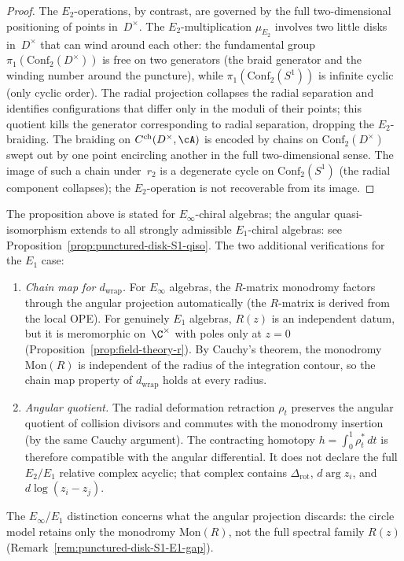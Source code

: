\begin{proof}
The $E_2$-operations, by contrast, are governed by the
full two-dimensional positioning of points in~$D^\times$.
The $E_2$-multiplication $\mu_{E_2}$ involves two
little disks in~$D^\times$ that can wind around each
other: the fundamental group
$\pi_1(\mathrm{Conf}_2(D^\times))$ is free on two
generators (the braid generator and the winding number
around the puncture), while
$\pi_1(\mathrm{Conf}_2(S^1))$ is infinite cyclic
(only cyclic order).
The radial projection collapses the radial separation
and identifies configurations that differ only in the
moduli of their points; this quotient kills the
generator corresponding to radial separation, dropping the $E_2$-braiding.
The braiding on
$C^{\mathrm{ch}}(D^\times,\cA)$ is encoded by chains
on $\mathrm{Conf}_2(D^\times)$ swept out by one point
encircling another in the full two-dimensional sense.
The image of such a chain under~$r_2$ is a
degenerate cycle on $\mathrm{Conf}_2(S^1)$ (the
radial component collapses); the $E_2$-operation
is not recoverable from its image.
\end{proof}

\begin{remark}%
\label{rem:chain-D-vs-S1-E1}%
The proposition above is stated for $E_\infty$-chiral
algebras; the angular quasi-isomorphism extends to all
strongly admissible $E_1$-chiral algebras: see
Proposition~\ref{prop:punctured-disk-S1-qiso}. The two
additional verifications for the $E_1$ case:
\begin{enumerate}[label=\textup{(\roman*)}]
\item \emph{Chain map for $d_{\mathrm{wrap}}$.}
 For $E_\infty$ algebras, the $R$-matrix monodromy
 factors through the angular projection automatically
 (the $R$-matrix is derived from the local OPE).
 For genuinely $E_1$ algebras, $R(z)$ is an independent
 datum, but it is meromorphic on~$\C^\times$ with poles
 only at $z=0$
 (Proposition~\ref{prop:field-theory-r}).
 By Cauchy's theorem, the monodromy
 $\mathrm{Mon}(R)$ is independent of the radius of
 the integration contour, so the chain map property
 of $d_{\mathrm{wrap}}$ holds at every radius.
\item \emph{Angular quotient.}
 The radial deformation retraction $\rho_t$ preserves the angular
 quotient of collision divisors and commutes with the monodromy
 insertion (by the same Cauchy argument). The contracting homotopy
 $h=\int_0^1\rho_t^*\,dt$ is therefore compatible with the angular
 differential. It does not declare the full \(E_2/E_1\) relative
 complex acyclic; that complex contains \(\Delta_{\mathrm{rot}}\),
 \(d\arg z_i\), and \(d\log(z_i-z_j)\).
\end{enumerate}
The $E_\infty$/$E_1$ distinction concerns what the angular projection
discards: the circle model retains only the monodromy
$\mathrm{Mon}(R)$, not the full spectral family $R(z)$
(Remark~\ref{rem:punctured-disk-S1-E1-gap}).
\end{remark}

